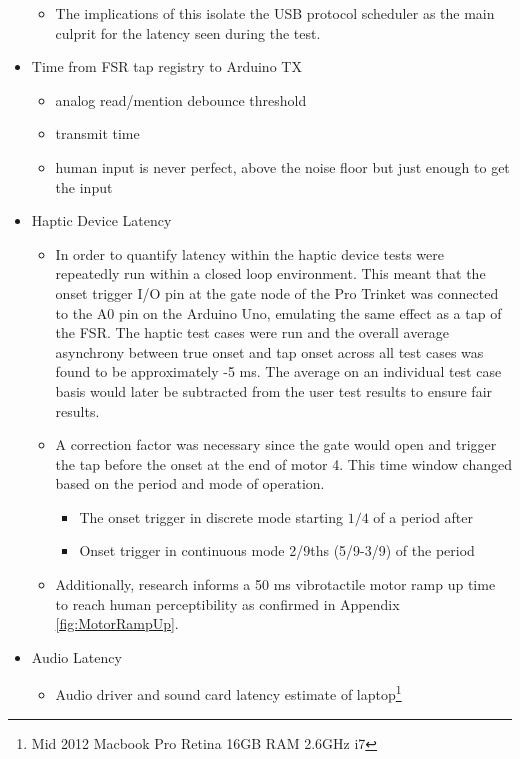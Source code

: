 \begin{itemize}
\begin{itemize}
            \item The implications of this isolate the USB protocol scheduler as the main culprit for the latency seen during the test.
        \end{itemize}
    \item Time from FSR tap registry to Arduino TX \label{FSRregistry}
    \begin{itemize}
        \item analog read/mention debounce threshold
        \item transmit time
        \item human input is never perfect, above the noise floor but just enough to get the input
    \end{itemize}
    \item Haptic Device Latency
    \begin{itemize}
        \item In order to quantify latency within the haptic device tests were repeatedly run within a closed loop environment. This meant that the onset trigger I/O pin at the gate node of the Pro Trinket was connected to the A0 pin on the Arduino Uno, emulating the same effect as a tap of the FSR. The haptic test cases were run and the overall average asynchrony between true onset and tap onset across all test cases was found to be approximately -5 ms. The average on an individual test case basis would later be subtracted from the user test results to ensure fair results.
        \item A correction factor was necessary since the gate would open and trigger the tap before the onset at the end of motor 4. This time window changed based on the period and mode of operation.
        \begin{itemize}
            \item The onset trigger in discrete mode starting $1/4$ of a period after
            \item Onset trigger in continuous mode 2/9ths (5/9-3/9) of the period
        \end{itemize}
        \item Additionally, research informs a 50 ms vibrotactile motor ramp up time to reach human perceptibility as confirmed in Appendix \ref{fig:MotorRampUp}.
    \end{itemize}
    \item Audio Latency
    \begin{itemize}
        \item Audio driver and sound card latency estimate of laptop\footnote{Mid 2012 Macbook Pro Retina 16GB RAM 2.6GHz i7}

\end{itemize}
\end{itemize}
